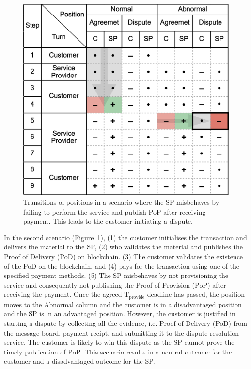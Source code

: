 \documentclass[pdftex,twocolumn,epjc3]{svjour3}
\begin{document}
\begin{figure}[h!]
\includegraphics[width=\linewidth]{misbehaviour.png}
\centering
\caption{Transitions of positions in a scenario where the SP misbehaves by failing to perform the service and publish $\mathrm{PoP}$ after receiving payment. This leads to the customer initiating a dispute.}
\label{fig:misbehaviour}
\end{figure}

In the second scenario (Figure~\ref{fig:misbehaviour}), (1) the customer initialises the transaction and delivers the material to the SP, (2) who validates the material and publishes the Proof of Delivery ($\mathrm{PoD}$) on blockchain. (3) The customer validates the existence of the PoD on the blockchain, and (4) pays for the transaction using one of the specified payment methods. (5) The SP misbehaves by not provisioning the service and consequently not publishing the Proof of Provision ($\mathrm{PoP}$) after receiving the payment. Once the agreed $\mathrm{T}_\mathrm{provide}$ deadline has passed, the position moves to the Abnormal column and the customer is in a disadvantaged position and the SP is in an advantaged position. However, the customer is justified in starting a dispute by collecting all the evidence, i.e. Proof of Delivery ($\mathrm{PoD}$) from the message board, payment $\mathrm{recipt}$, and submitting it to the dispute resolution service. The customer is likely to win this dispute as the SP cannot prove the timely publication of $\mathrm{PoP}$. This scenario results in a neutral outcome for the customer and a disadvantaged outcome for the SP.
\end{document}
